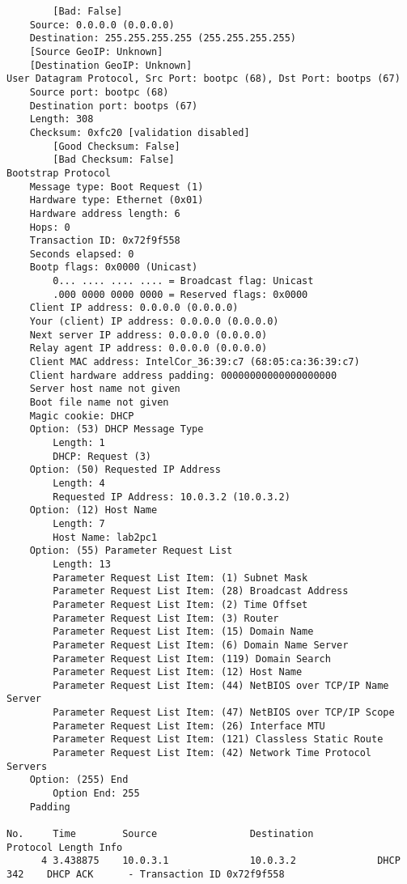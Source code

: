 \begin{lstlisting}
        [Bad: False]
    Source: 0.0.0.0 (0.0.0.0)
    Destination: 255.255.255.255 (255.255.255.255)
    [Source GeoIP: Unknown]
    [Destination GeoIP: Unknown]
User Datagram Protocol, Src Port: bootpc (68), Dst Port: bootps (67)
    Source port: bootpc (68)
    Destination port: bootps (67)
    Length: 308
    Checksum: 0xfc20 [validation disabled]
        [Good Checksum: False]
        [Bad Checksum: False]
Bootstrap Protocol
    Message type: Boot Request (1)
    Hardware type: Ethernet (0x01)
    Hardware address length: 6
    Hops: 0
    Transaction ID: 0x72f9f558
    Seconds elapsed: 0
    Bootp flags: 0x0000 (Unicast)
        0... .... .... .... = Broadcast flag: Unicast
        .000 0000 0000 0000 = Reserved flags: 0x0000
    Client IP address: 0.0.0.0 (0.0.0.0)
    Your (client) IP address: 0.0.0.0 (0.0.0.0)
    Next server IP address: 0.0.0.0 (0.0.0.0)
    Relay agent IP address: 0.0.0.0 (0.0.0.0)
    Client MAC address: IntelCor_36:39:c7 (68:05:ca:36:39:c7)
    Client hardware address padding: 00000000000000000000
    Server host name not given
    Boot file name not given
    Magic cookie: DHCP
    Option: (53) DHCP Message Type
        Length: 1
        DHCP: Request (3)
    Option: (50) Requested IP Address
        Length: 4
        Requested IP Address: 10.0.3.2 (10.0.3.2)
    Option: (12) Host Name
        Length: 7
        Host Name: lab2pc1
    Option: (55) Parameter Request List
        Length: 13
        Parameter Request List Item: (1) Subnet Mask
        Parameter Request List Item: (28) Broadcast Address
        Parameter Request List Item: (2) Time Offset
        Parameter Request List Item: (3) Router
        Parameter Request List Item: (15) Domain Name
        Parameter Request List Item: (6) Domain Name Server
        Parameter Request List Item: (119) Domain Search
        Parameter Request List Item: (12) Host Name
        Parameter Request List Item: (44) NetBIOS over TCP/IP Name Server
        Parameter Request List Item: (47) NetBIOS over TCP/IP Scope
        Parameter Request List Item: (26) Interface MTU
        Parameter Request List Item: (121) Classless Static Route
        Parameter Request List Item: (42) Network Time Protocol Servers
    Option: (255) End
        Option End: 255
    Padding

No.     Time        Source                Destination           Protocol Length Info
      4 3.438875    10.0.3.1              10.0.3.2              DHCP     342    DHCP ACK      - Transaction ID 0x72f9f558


\end{lstlisting}

